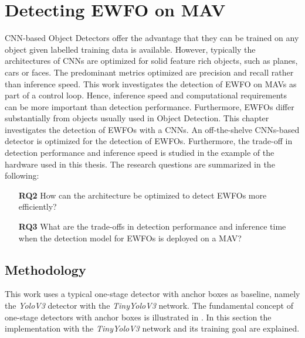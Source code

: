 	\chapter{Detecting \ac{EWFO} on \ac{MAV}}
	\label{sec:object_detection}
	
	\ac{CNN}-based Object Detectors offer the advantage that they can be trained on any object given labelled training data is available. However, typically the architectures of \acp{CNN} are optimized for solid feature rich objects, such as planes, cars or faces. The predominant metrics optimized are precision and recall rather than inference speed. This work investigates the detection of \ac{EWFO} on \acp{MAV} as part of a control loop. Hence, inference speed and computational requirements can be more important than detection performance. Furthermore, \acp{EWFO} differ substantially from objects usually used in Object Detection. This chapter investigates the detection of \acp{EWFO} with a \acp{CNN}. An off-the-shelve \acp{CNN}-based detector is optimized for the detection of \acp{EWFO}. Furthermore, the trade-off in detection performance and inference speed is studied in the example of the hardware used in this thesis. The research questions are summarized in the following:
	
\begin{enumerate}
	\item[\textbf{RQ2}]How can the architecture be optimized to detect \acp{EWFO} more efficiently?
	\item[\textbf{RQ3}]What are the trade-offs in detection performance and inference time when the detection model for \acp{EWFO} is deployed on a \ac{MAV}?
\end{enumerate}

	\section{Methodology}
		
	This work uses a typical one-stage detector with anchor boxes as baseline, namely the \textit{YoloV3} detector with the \textit{TinyYoloV3} network. The fundamental concept of one-stage detectors with anchor boxes is illustrated in . In this section the implementation with the \textit{TinyYoloV3} network and its training goal are explained.
	
